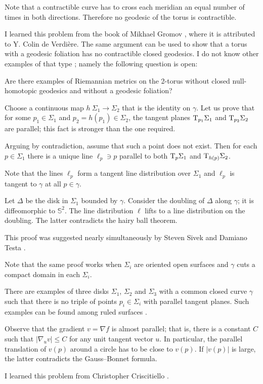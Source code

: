 Note that a contractible curve has to cross each meridian an equal number of times in both directions.
Therefore no geodesic of the torus is contractible.\qeds 


I learned this problem 
from the book of Mikhael Gromov \cite{gromov-MetStr},
where it is attributed to Y. Colin de Verdi\`ere.
The same argument can be used to show that a torus with a geodesic foliation has no contractible closed geodesics.
I do not know other examples of that type \cite{petrunin-torus}; namely the following question is open:

\begin{pr}
Are there examples of Riemannian metrics on the 2-torus without closed null-homotopic geodesics and without a geodesic foliation?
\end{pr}


Choose a continuous map $h\:\Sigma_1\to \Sigma_2$
that is the identity on $\gamma$.
Let us prove that for some $p_1\in \Sigma_1$ and $p_2=h(p_1)\in \Sigma_2$,
the tangent planes $\mathrm{T}_{p_1} \Sigma_1$ and  $\mathrm{T}_{p_2} \Sigma_2$ are parallel;
this fact is stronger than the one required.

\medskip

Arguing by contradiction,
assume that such a point does not exist.
Then for each $p\in\Sigma_1$
there is a unique line $\ell_p\ni p$ 
 parallel to both $\mathrm{T}_{p} \Sigma_1$ and $\mathrm{T}_{h(p)} \Sigma_2$.

Note that the lines $\ell_p$ form a tangent line distribution over $\Sigma_1$
and $\ell_p$ is tangent to $\gamma$ at all $p\in\gamma$.

Let $\Delta$ be the disk in $\Sigma_1$ bounded by $\gamma$.
Consider the doubling of $\Delta$ along  $\gamma$;
it is diffeomorphic to $\mathbb S^2$.
The line distribution $\ell$ lifts to a line distribution on the doubling.
The latter contradicts the hairy ball theorem.\qeds


This proof was suggested nearly simultaneously 
by Steven Sivek 
and Damiano Testa \cite{two-disks}.

Note that the same proof works when $\Sigma_i$ are oriented open surfaces and $\gamma$ cuts a compact domain in each $\Sigma_i$.

There are examples of three disks $\Sigma_1$, $\Sigma_2$ and $\Sigma_3$
with a common closed curve $\gamma$ such that there is
no triple of points $p_i\in\Sigma_i$ with parallel tangent planes.
Such examples can be found among ruled surfaces \cite{three-disks}.

Observe that the gradient $v=\nabla f$ is almost parallel;
that is, there is a constant $C$ such that $|\nabla_u v|\le C$ for any unit tangent vector $u$.
In particular, the parallel translation of $v(p)$ around a circle has to be close to $v(p)$.
If $|v(p)|$ is large, the latter contradicts the Gauss--Bonnet formula.

\medskip

I learned this problem from Christopher Criscitiello \cite{ccriscitiello}.
